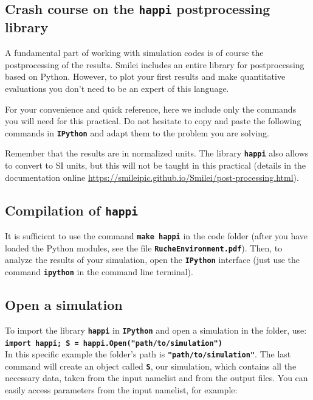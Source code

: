 \documentclass[a4paper,12pt]{extarticle}
\newcommand{\smilei}{{\sc Smilei}\xspace}
\newcommand{\commandline}[1]{\texttt{\textbf{#1}}}
\begin{document}
\begin{appendices}
\section{Crash course on the \commandline{happi} postprocessing library}\label{happi}
A fundamental part of working with simulation codes is of course the postprocessing of the results. \smilei includes an entire library for postprocessing based on Python. However, to  plot your first results and make quantitative evaluations you don't need to be an expert of this language.

For your convenience and quick reference, here we include only the commands you will need for this practical. Do not hesitate to copy and paste the following commands in \commandline{IPython} and adapt them to the problem you are solving.

Remember that the results are in normalized units. The library \commandline{happi} also allows to convert to SI units, but this will not be taught in this practical (details in the documentation online \url{https://smileipic.github.io/Smilei/post-processing.html}).

\subsection*{Compilation of \commandline{happi}}
It is sufficient to use the command \commandline{make happi} in the code folder (after you have loaded the Python modules, see the file \commandline{RucheEnvironment.pdf}). Then, to analyze the results of your simulation, open the \commandline{IPython} interface (just use the command \commandline{ipython} in the command line terminal). 

\subsection*{Open a simulation}
To import the library \commandline{happi} in \commandline{IPython} and open a simulation in the folder,  use:\\

\commandline{import happi; S =  happi.Open("path/to/simulation")}\\

In this specific example the folder's path is \commandline{"path/to/simulation"}. The last command will create an object called \commandline{S}, our simulation, which contains all the necessary data, taken from the input namelist and from the output files. You can easily access parameters from the input namelist, for  example:\\


\end{appendices}
\end{document}
